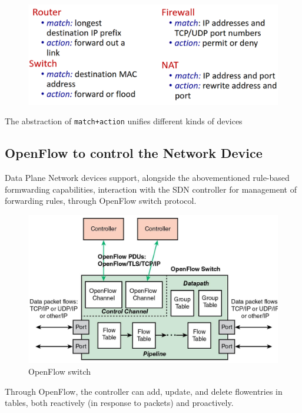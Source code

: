 \begin{figure}[htbp]
   \centering
   \includegraphics{images/openflow_matchaction.png}
   \label{fig:openflow_matchaction}
\end{figure}
The abstraction of \texttt{match+action} unifies different kinds of devices

\subsection{OpenFlow to control the Network Device}
Data Plane Network devices support, alongside the abovementioned rule-based formwarding capabilities, interaction with the SDN controller for management of forwarding rules, through OpenFlow switch protocol.

\begin{figure}[htbp]
   \centering
   \includegraphics{images/openflow_switch.png}
   \caption{OpenFlow switch}
   \label{fig:openflow_switch}
\end{figure}
Through OpenFlow, the controller can add, update, and delete flowentries in tables, both reactively (in response to packets) and proactively.


